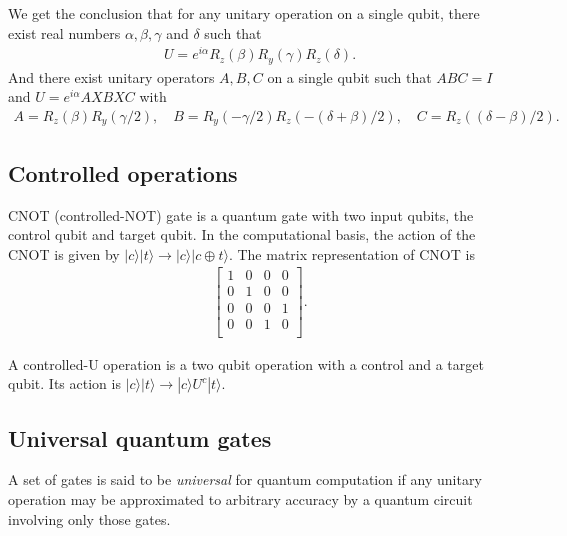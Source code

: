 \documentclass{article}
\newcommand{\ket}[1]{| #1 \rangle}  %
\begin{document}
We get the conclusion that for any unitary operation on a single qubit, there exist real numbers $\alpha,\beta,\gamma$ and $\delta$ such that
\begin{align}
	U=e^{i\alpha} R_{z}(\beta)R_{y}(\gamma)R_{z}(\delta).
\end{align}
And there exist unitary operators $A,B,C$ on a single qubit such that $ABC=I$ and $U=e^{i\alpha}AXBXC$ with
\begin{align}
	A=R_z(\beta)R_y(\gamma/2), \quad B=R_y(-\gamma/2)R_z(-(\delta+\beta)/2), \quad C=R_z((\delta-\beta)/2).
\end{align}




\subsection{Controlled operations}

CNOT (controlled-NOT) gate is a quantum gate with two input qubits, the control qubit and target qubit. In the computational basis, the action of the CNOT is given by $\ket{c}\ket{t}\rightarrow \ket{c}\ket{c\oplus t}$. The matrix representation of CNOT is
\begin{align}
	\left[ \begin{array}{cccc} 
		1&0&0&0\\ 
		0&1&0&0\\ 
		0&0&0&1\\
		0&0&1&0\\
	\end{array} \right].
\end{align}

A controlled-U operation is a two qubit operation with a control and a target qubit. Its action is $\ket{c}\ket{t}\rightarrow \ket{c}U^c\ket{t}$.




\subsection{Universal quantum gates}

A set of gates is said to be \textit{universal} for quantum computation if any unitary operation may be approximated to arbitrary accuracy by a quantum circuit involving only those gates.
\end{document}
